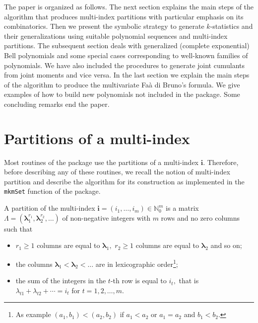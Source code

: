 The paper is organized as follows. The next section explains the main
steps of the algorithm that produces multi-index partitions with
particular emphasis on its combinatorics. Then we present the symbolic
strategy to generate \(k\)-statistics and their generalizations using
suitable polynomial sequences and multi-index partitions. The subsequent
section deals with generalized (complete exponential) Bell polynomials
and some special cases corresponding to well-known families of
polynomials. We have also included the procedures to generate joint
cumulants from joint moments and vice versa. In the last section we
explain the main steps of the algorithm to produce the multivariate Faà
di Bruno's formula. We give examples of how to build new polynomials not
included in the package. Some concluding remarks end the paper.

\hypertarget{partitions-of-a-multi-index}{%
\section{Partitions of a
multi-index}\label{partitions-of-a-multi-index}}

Most routines of the  package use the partitions of
a multi-index \(\boldsymbol{i}.\) Therefore, before describing any of
these routines, we recall the notion of multi-index partition and
describe the algorithm for its construction as implemented in the
\texttt{mkmSet} function of the package.

A partition of the multi-index
\(\boldsymbol{i} = (i_1, \ldots, i_m) \in {\mathbb N}_0^m\) is a matrix
\(\Lambda = (\boldsymbol{\lambda}_1^{r_1}, \boldsymbol{\lambda}_2^{r_2}, \ldots)\)
of non-negative integers with \(m\) rows and no zero columns such that

\begin{itemize}
\item
  \(r_1 \geq 1\) columns are equal to \(\boldsymbol{\lambda}_1,\)
  \(r_2 \geq 1\) columns are equal to \(\boldsymbol{\lambda}_2\) and so
  on;
\item
  the columns
  \(\boldsymbol{\lambda}_1 < \boldsymbol{\lambda}_2 < \ldots\) are in
  lexicographic order\footnote{As example \((a_1,b_1) < (a_2,b_2)\) if
    \(a_1 < a_2\) or \(a_1=a_2\) and \(b_1<b_2.\)};
\item
  the sum of the integers in the \(t\)-th row is equal to \(i_t,\) that
  is \(\lambda_{t 1}+\lambda_{t 2}+\cdots = i_t\) for
  \(t = 1,2,\ldots,m.\)
\end{itemize}

